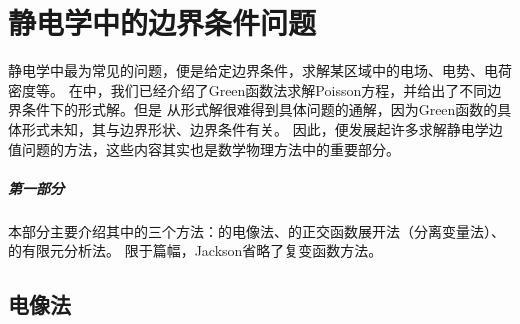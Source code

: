 \chapter{静电学中的边界条件问题}
\label{chap:boundary-value problems}

静电学中最为常见的问题，便是给定边界条件，求解某区域中的电场、电势、电荷密度等。
在中，我们已经介绍了Green函数法求解Poisson方程，并给出了不同边界条件下的形式解。但是%
从形式解很难得到具体问题的通解，因为Green函数的具体形式未知，其与边界形状、边界条件有关。%
因此，便发展起许多求解静电学边值问题的方法，这些内容其实也是数学物理方法中的重要部分。


\paragraph{第一部分}

本部分主要介绍其中的三个方法：的电像法、的正交函数展开法（分离变量法）、的有限元分析法。
限于篇幅，Jackson省略了复变函数方法。%

\usetikzlibrary{circuits.ee.IEC}

\section{电像法}
\label{sec:method of images}

